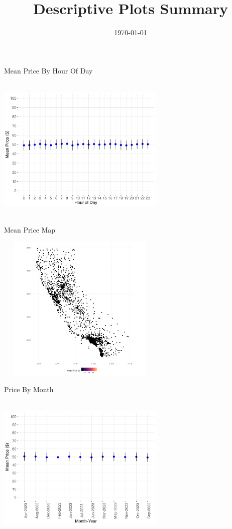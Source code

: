 \documentclass{beamer}
\title{Descriptive Plots Summary}
\date{\today}
\begin{document}
\frame{\titlepage}
\begin{frame}{Mean Price By Hour Of Day}
\begin{center}
\includegraphics[width = 8cm, height = 7cm]{mean_price_by_hour_of_day}
\end{center}
\end{frame}

\begin{frame}{Mean Price Map}
\begin{center}
\includegraphics[width = 8cm, height = 7cm]{mean_price_map}
\end{center}
\end{frame}

\begin{frame}{Price By Month}
\begin{center}
\includegraphics[width = 8cm, height = 7cm]{price_by_month}
\end{center}
\end{frame}
\end{document}
